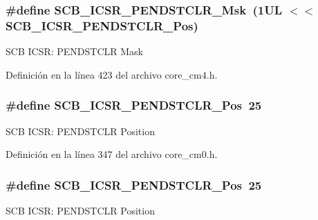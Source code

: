 \subsubsection[{\texorpdfstring{S\+C\+B\+\_\+\+I\+C\+S\+R\+\_\+\+P\+E\+N\+D\+S\+T\+C\+L\+R\+\_\+\+Msk}{SCB_ICSR_PENDSTCLR_Msk}}]{\setlength{\rightskip}{0pt plus 5cm}\#define S\+C\+B\+\_\+\+I\+C\+S\+R\+\_\+\+P\+E\+N\+D\+S\+T\+C\+L\+R\+\_\+\+Msk~(1\+U\+L $<$$<$ S\+C\+B\+\_\+\+I\+C\+S\+R\+\_\+\+P\+E\+N\+D\+S\+T\+C\+L\+R\+\_\+\+Pos)}\hypertarget{group___c_m_s_i_s___s_c_b_gab241827d2a793269d8cd99b9b28c2157}{}\label{group___c_m_s_i_s___s_c_b_gab241827d2a793269d8cd99b9b28c2157}
S\+CB I\+C\+SR\+: P\+E\+N\+D\+S\+T\+C\+LR Mask 

Definición en la línea 423 del archivo core\+\_\+cm4.\+h.

\subsubsection[{\texorpdfstring{S\+C\+B\+\_\+\+I\+C\+S\+R\+\_\+\+P\+E\+N\+D\+S\+T\+C\+L\+R\+\_\+\+Pos}{SCB_ICSR_PENDSTCLR_Pos}}]{\setlength{\rightskip}{0pt plus 5cm}\#define S\+C\+B\+\_\+\+I\+C\+S\+R\+\_\+\+P\+E\+N\+D\+S\+T\+C\+L\+R\+\_\+\+Pos~25}\hypertarget{group___c_m_s_i_s___s_c_b_gadbe25e4b333ece1341beb1a740168fdc}{}\label{group___c_m_s_i_s___s_c_b_gadbe25e4b333ece1341beb1a740168fdc}
S\+CB I\+C\+SR\+: P\+E\+N\+D\+S\+T\+C\+LR Position 

Definición en la línea 347 del archivo core\+\_\+cm0.\+h.

\subsubsection[{\texorpdfstring{S\+C\+B\+\_\+\+I\+C\+S\+R\+\_\+\+P\+E\+N\+D\+S\+T\+C\+L\+R\+\_\+\+Pos}{SCB_ICSR_PENDSTCLR_Pos}}]{\setlength{\rightskip}{0pt plus 5cm}\#define S\+C\+B\+\_\+\+I\+C\+S\+R\+\_\+\+P\+E\+N\+D\+S\+T\+C\+L\+R\+\_\+\+Pos~25}\hypertarget{group___c_m_s_i_s___s_c_b_gadbe25e4b333ece1341beb1a740168fdc}{}\label{group___c_m_s_i_s___s_c_b_gadbe25e4b333ece1341beb1a740168fdc}
S\+CB I\+C\+SR\+: P\+E\+N\+D\+S\+T\+C\+LR Position 

